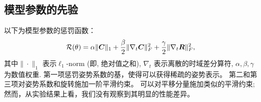 \subsection{模型参数的先验}

以下为模型参数的惩罚函数：
\begin{align}\label{eq:prior}
\mathcal{R}(\theta) = \alpha\|{\bm{C}}\|_1 + \frac{\beta}{2}\|\nabla_t{\bm{C}}\|_F^2 + \frac{\gamma}{2}\|\nabla_t{\bm{R}}\|_F^2,
\end{align}
其中$\|\cdot\|_1$ 表示$\ell_1$-norm (即, 绝对值之和), $\nabla_t$ 表示离散的时域差分算符, $\alpha, \beta, \gamma$ 为数值权重. 
第一项惩罚姿势系数的基，使得可以获得稀疏的姿势表示。 第二和第三项对姿势系数和旋转施加一阶平滑约束。
可以对平移分量施加类似的平滑约束; 然而，从实验结果上看，我们没有观察到其明显的性能差异。


